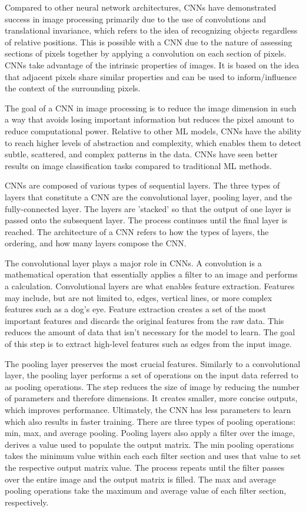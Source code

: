 \documentclass[10pt,twocolumn]{article}
\begin{document}
Compared to other neural network architectures, CNNs have demonstrated success in image processing primarily due to the use of convolutions and translational invariance, which refers to the idea of recognizing objects regardless of relative positions. This is possible with a CNN due to the nature of assessing sections of pixels together by applying a convolution on each section of pixels. CNNs take advantage of the intrinsic properties of images. It is based on the idea that adjacent pixels share similar properties and can be used to inform/influence the context of the surrounding pixels. 

The goal of a CNN in image processing is to reduce the image dimension in such a way that avoids losing important information but reduces the pixel amount to reduce computational power. Relative to other ML models, CNNs have the ability to reach higher levels of abstraction and complexity, which enables them to detect subtle, scattered, and complex patterns in the data. CNNs have seen better results on image classification tasks compared to traditional ML methods.

CNNs are composed of various types of sequential layers. The three types of layers that constitute a CNN are the convolutional layer, pooling layer, and the fully-connected layer. The layers are 'stacked' so that the output of one layer is passed onto the subsequent layer. The process continues until the final layer is reached. The architecture of a CNN refers to how the types of layers, the ordering, and how many layers compose the CNN.

The convolutional layer plays a major role in CNNs. A convolution is a mathematical operation that essentially applies a filter to an image and performs a calculation. Convolutional layers are what enables feature extraction. Features may include, but are not limited to, edges, vertical lines, or more complex features such as a dog's eye. Feature extraction creates a set of the most important features and discards the original features from the raw data. This reduces the amount of data that isn't necessary for the model to learn. The goal of this step is to extract high-level features such as edges from the input image. 

The pooling layer preserves the most crucial features. Similarly to a convolutional layer, the pooling layer performs a set of operations on the input data referred to as pooling operations. The step reduces the size of image by reducing the number of parameters and therefore dimensions. It creates smaller, more concise outputs, which improves performance. Ultimately, the CNN has less parameters to learn which also results in faster training. There are three types of pooling operations: min, max, and average pooling. Pooling layers also apply a filter over the image, derives a value used to populate the output matrix. The min pooling operations takes the minimum value within each each filter section and uses that value to set the respective output matrix value. The process repeats until the filter passes over the entire image and the output matrix is filled. The max and average pooling operations take the maximum and average value of each filter section, respectively.
\end{document}
